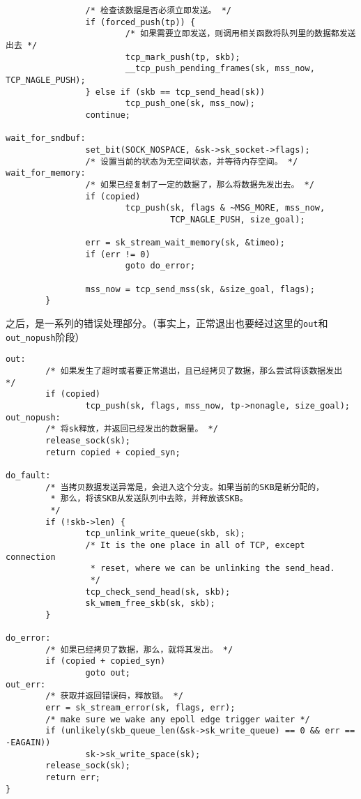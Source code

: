 \begin{verbatim}
                /* 检查该数据是否必须立即发送。 */
                if (forced_push(tp)) {
                        /* 如果需要立即发送，则调用相关函数将队列里的数据都发送出去 */
                        tcp_mark_push(tp, skb);
                        __tcp_push_pending_frames(sk, mss_now, TCP_NAGLE_PUSH);
                } else if (skb == tcp_send_head(sk))
                        tcp_push_one(sk, mss_now);
                continue;

wait_for_sndbuf:
                set_bit(SOCK_NOSPACE, &sk->sk_socket->flags);
                /* 设置当前的状态为无空间状态，并等待内存空间。 */
wait_for_memory:
                /* 如果已经复制了一定的数据了，那么将数据先发出去。 */
                if (copied)
                        tcp_push(sk, flags & ~MSG_MORE, mss_now,
                                 TCP_NAGLE_PUSH, size_goal);

                err = sk_stream_wait_memory(sk, &timeo);
                if (err != 0)
                        goto do_error;

                mss_now = tcp_send_mss(sk, &size_goal, flags);
        }
\end{verbatim}
之后，是一系列的错误处理部分。（事实上，正常退出也要经过这里的\texttt{out}和
\texttt{out_nopush}阶段）
\begin{verbatim}
out:
        /* 如果发生了超时或者要正常退出，且已经拷贝了数据，那么尝试将该数据发出 */
        if (copied)
                tcp_push(sk, flags, mss_now, tp->nonagle, size_goal);
out_nopush:
        /* 将sk释放，并返回已经发出的数据量。 */
        release_sock(sk);
        return copied + copied_syn;

do_fault:
        /* 当拷贝数据发送异常是，会进入这个分支。如果当前的SKB是新分配的，
         * 那么，将该SKB从发送队列中去除，并释放该SKB。
         */
        if (!skb->len) {
                tcp_unlink_write_queue(skb, sk);
                /* It is the one place in all of TCP, except connection
                 * reset, where we can be unlinking the send_head.
                 */
                tcp_check_send_head(sk, skb);
                sk_wmem_free_skb(sk, skb);
        }

do_error:
        /* 如果已经拷贝了数据，那么，就将其发出。 */
        if (copied + copied_syn)
                goto out;
out_err:
        /* 获取并返回错误码，释放锁。 */
        err = sk_stream_error(sk, flags, err);
        /* make sure we wake any epoll edge trigger waiter */
        if (unlikely(skb_queue_len(&sk->sk_write_queue) == 0 && err == -EAGAIN))
                sk->sk_write_space(sk);
        release_sock(sk);
        return err;
}
\end{verbatim}

